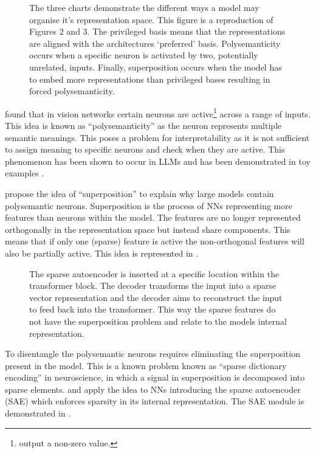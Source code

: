 \begin{figure}
    \centering
    \captionsetup{width=.9\textwidth}
    
    \caption{The three charts demonstrate the different ways a model may organise it's representation space. This figure is a reproduction of \citet{superposition} Figures 2 and 3. The privileged basis means that the representations are aligned with the architectures `preferred' basis. Polysemanticity occurs when a specific neuron is activated by two, potentially unrelated, inputs. Finally, superposition occurs when the model has to embed more representations than privileged bases resulting in forced polysemanticity.}
    \label{fig:superposition}
\end{figure}

\citet{polysemanticity} found that in vision networks certain neurons are active\footnote{output a non-zero value.} across a range of inputs.
This idea is known as ``polysemanticity'' as the neuron represents multiple semantic meanings.
This poses a problem for interpretability as it is not sufficient to assign meaning to specific neurons and check when they are active.
This phenomenon has been shown to occur in LLMs and has been demonstrated in toy examples \citep{superposition}.

\citet{superposition} propose the idea of ``superposition'' to explain why large models contain polysemantic neurons.
Superposition is the process of NNs representing more features than neurons within the model.
The features are no longer represented orthogonally in the representation space but instead share components.
This means that if only one (sparse) feature is active the non-orthogonal features will also be partially active.
This idea is represented in .

\begin{figure}
    \centering
    \captionsetup{width=.9\textwidth}
    
    \caption{The sparse autoencoder is inserted at a specific location within the transformer block. The decoder transforms the input into a sparse vector representation and the decoder aims to reconstruct the input to feed back into the transformer. This way the sparse features do not have the superposition problem and relate to the models internal representation.}
    \label{fig:sae}
\end{figure}

To disentangle the polysemantic neurons requires eliminating the superposition present in the model.
This is a known problem known as ``sparse dictionary encoding'' \citep{sparse-coding} in neuroscience, in which a signal in superposition is decomposed into sparse elements.
\citet{sae-orig} and \citet{saes} apply the idea to NNs introducing the sparse autoencoder (SAE) which enforces sparsity in its internal representation.
The SAE module is demonstrated in .

